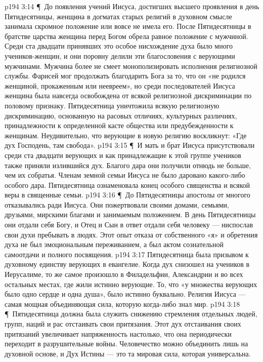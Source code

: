 \vs p194 3:14 \P\ До появления учений Иисуса, достигших высшего проявления в день Пятидесятницы, женщина в догматах старых религий в духовном смысле занимала скромное положение или вовсе не имела его. После Пятидесятницы в братстве царства женщина перед Богом обрела равное положение с мужчиной. Среди ста двадцати принявших это особое нисхождение духа было много учеников\hyp{}женщин, и они поровну делили эти благословения с верующими мужчинами. Мужчина более не смеет монополизировать исполнения религиозной службы. Фарисей мог продолжать благодарить Бога за то, что он «не родился женщиной, прокаженным или неевреем», но среди последователей Иисуса женщина была навсегда освобождена от всякой религиозной дискриминации по половому признаку. Пятидесятница уничтожила всякую религиозную дискриминацию, основанную на расовых отличиях, культурных различиях, принадлежности к определенной касте общества или предубежденности к женщинам. Неудивительно, что верующие в новую религию воскликнут: «Где дух Господень, там свобода».
\vs p194 3:15 \P\ И мать и брат Иисуса присутствовали среди ста двадцати верующих и как принадлежащие к этой группе учеников также приняли излившийся дух. Благого дара они получили отнюдь не больше, чем их собратья. Членам земной семьи Иисуса не было даровано какого\hyp{}либо особого дара. Пятидесятница ознаменовала конец особого священства и всякой веры в священные семьи.
\vs p194 3:16 \P\ До Пятидесятницы апостолы от многого отказывались ради Иисуса. Они пожертвовали своими домами, семьями, друзьями, мирскими благами и занимаемым положением. В день Пятидесятницы они отдали себя Богу, и Отец и Сын в ответ отдали себя человеку --- ниспослав свои духи пребывать в людях. Этот опыт отказа от собственного «я» и обретения духа не был эмоциональным переживанием, а был актом сознательной самоотдачи и полного посвящения.
\vs p194 3:17 Пятидесятница была призывом к духовному единству верующих в евангелие. Когда дух снизошел на учеников в Иерусалиме, то же самое произошло в Филадельфии, Александрии и во всех остальных местах, где жили истинно верующие. То, что «у множества верующих было одно сердце и одна душа», было истинно буквально. Религия Иисуса --- самая мощная объединяющая сила, которую когда\hyp{}либо знал мир.
\vs p194 3:18 \P\ Пятидесятница должна была служить снижению стремления отдельных людей, групп, наций и рас отстаивать свои притязания. Этот дух отстаивания своих притязаний увеличивает напряженность настолько, что она периодически переходит в разрушительные войны. Человечество можно объединить лишь на духовной основе, и Дух Истины --- это та мировая сила, которая универсальна.
